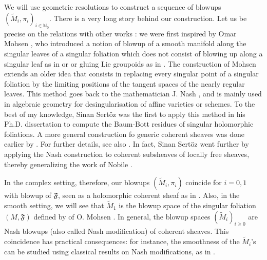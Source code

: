 \documentclass[10pt]{article}
\theoremstyle{plain}
\theoremstyle{definition}
\theoremstyle{remark}
\begin{document}
      We will use geometric resolutions to construct a  sequence of blowups $\left(\widetilde M_i,\pi_i\right)_{i\in \mathbb N_0}$.
There is a very long story behind our construction. Let us be precise on the relations with other works : we were first inspired by Omar Mohsen \cite{MohsenOmar}, who introduced a notion of  blowup of a smooth manifold along the singular leaves of a singular foliation which does not consist of blowing up along a singular leaf as in \cite{Wang-Tang} or \cite{DebordClaire2017BcfL} or gluing Lie groupoids as in \cite{NistorVictor2019DoLg}. The construction of Mohsen extends an older idea that consists in  replacing every singular point of a singular foliation by the limiting positions of the tangent spaces of the nearly regular leaves. This  method goes back to the mathematician J. Nash \cite{Nobile}, and is mainly used in algebraic geometry for desingularisation of affine varieties or schemes. To the best of my knowledge,  Sinan Sertöz \cite{Ali-Sinan} was the first to apply this method in his Ph.D. dissertation  to compute the Baum-Bott residues of singular holomorphic foliations. A more general construction fo generic coherent sheaves was done earlier by \cite{Rossi}. For further details, see also \cite{JPTS}. In fact, Sinan Sertöz went further by applying the Nash construction to coherent subsheaves of locally free sheaves, thereby generalizing the work of Nobile \cite{Nobile}.

In the complex setting, therefore, our blowups $\left(\widetilde M_i,\pi_i\right)$  coincide for $i=0,1$ with blowup of $ \mathfrak F$, seen as a holomorphic coherent sheaf as in \cite{Rossi,Ali-Sinan, JPTS}. Also, in the smooth setting, we will see that $\widetilde M_1$ is the blowup space of the singular foliation  $(M, \mathfrak F)$  defined by of O. Mohsen \cite{MohsenOmar}. 
    In general, the blowup spaces  $(\widetilde M_i)_{i\geq 0}$ are  Nash blowups (also called Nash modification) of coherent sheaves. This coincidence has practical consequences: for instance, the smoothness of the $\widetilde M_i$'s can be studied using classical results on Nash modifications, as in \cite{Ali-Sinan}. 
\end{document}
